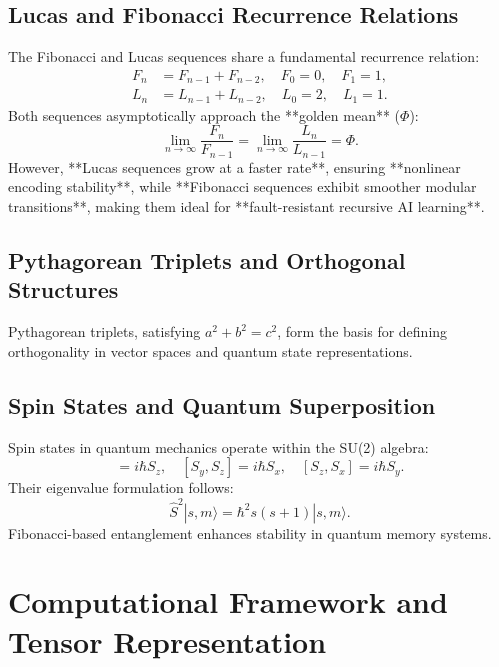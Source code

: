 \documentclass{article}
\theoremstyle{plain}
\begin{document}
\subsection{Lucas and Fibonacci Recurrence Relations}
The Fibonacci and Lucas sequences share a fundamental recurrence relation:
\begin{align}
    F_n &= F_{n-1} + F_{n-2}, \quad F_0 = 0, \quad F_1 = 1,\\
    L_n &= L_{n-1} + L_{n-2}, \quad L_0 = 2, \quad L_1 = 1.
\end{align}
Both sequences asymptotically approach the **golden mean** (\(\Phi\)):
\begin{equation}
    \lim_{n\to\infty} \frac{F_n}{F_{n-1}} = \lim_{n\to\infty} \frac{L_n}{L_{n-1}} = \Phi.
\end{equation}
However, **Lucas sequences grow at a faster rate**, ensuring **nonlinear encoding stability**, while **Fibonacci sequences exhibit smoother modular transitions**, making them ideal for **fault-resistant recursive AI learning**.
\subsection{Pythagorean Triplets and Orthogonal Structures}
Pythagorean triplets, satisfying $a^2 + b^2 = c^2$, form the basis for defining orthogonality in vector spaces and quantum state representations.

\subsection{Spin States and Quantum Superposition}
Spin states in quantum mechanics operate within the SU(2) algebra:
\begin{equation}
    [S_x, S_y] = i\hbar S_z, \quad [S_y, S_z] = i\hbar S_x, \quad [S_z, S_x] = i\hbar S_y.
\end{equation}
Their eigenvalue formulation follows:
\begin{equation}
    \hat{S}^2 |s, m\rangle = \hbar^2 s(s+1) |s, m\rangle.
\end{equation}
Fibonacci-based entanglement enhances stability in quantum memory systems.

\section{Computational Framework and Tensor Representation}
\end{document}
